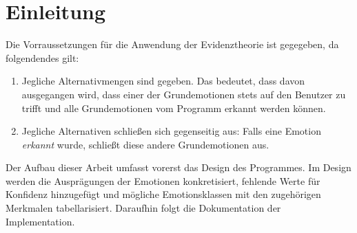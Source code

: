 \chapter{Einleitung}
Die Vorraussetzungen für die Anwendung der Evidenztheorie ist gegegeben, da folgendendes gilt:

\begin{enumerate}
  \item Jegliche Alternativmengen sind gegeben. Das bedeutet, dass davon ausgegangen wird, dass einer der Grundemotionen stets auf den Benutzer zu trifft und alle Grundemotionen vom Programm erkannt werden können. 
  \item Jegliche Alternativen schließen sich gegenseitig aus: Falls eine Emotion \textit{erkannt} wurde, schließt diese andere Grundemotionen aus.
\end{enumerate}


Der Aufbau dieser Arbeit umfasst vorerst das Design des Programmes. Im Design werden die Ausprägungen der Emotionen konkretisiert, fehlende Werte für Konfidenz hinzugefügt und mögliche Emotionsklassen mit den zugehörigen Merkmalen tabellarisiert. Daraufhin folgt die Dokumentation der Implementation. 